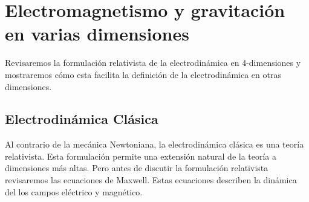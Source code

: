 \chapter{Electromagnetismo y gravitación en varias dimensiones}
Revisaremos la formulación relativista de la electrodinámica en 4-dimensiones y mostraremos cómo esta facilita la definición de la electrodinámica en otras dimensiones.

\section{Electrodinámica Clásica}
Al contrario de la mecánica Newtoniana, la electrodinámica clásica es una teoría relativista. Esta formulación permite una extensión natural de la teoría a dimensiones más altas. Pero antes de discutir la formulación relativista revisaremos las ecuaciones de Maxwell. Estas ecuaciones describen la dinámica del los campos eléctrico y magnético.

